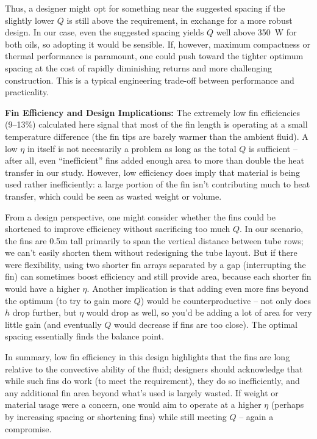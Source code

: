 \documentclass[12pt]{article}
\begin{document}
Thus, a designer might opt for something near the suggested spacing if the slightly lower $Q$ is still above the requirement, in exchange for a more robust design. In our case, even the suggested spacing yields $Q$ well above 350~W for both oils, so adopting it would be sensible. If, however, maximum compactness or thermal performance is paramount, one could push toward the tighter optimum spacing at the cost of rapidly diminishing returns and more challenging construction. This is a typical engineering trade-off between performance and practicality.

\textbf{Fin Efficiency and Design Implications:} The extremely low fin efficiencies (9–13\%) calculated here signal that most of the fin length is operating at a small temperature difference (the fin tips are barely warmer than the ambient fluid). A low $\eta$ in itself is not necessarily a problem as long as the total $Q$ is sufficient – after all, even “inefficient” fins added enough area to more than double the heat transfer in our study. However, low efficiency does imply that material is being used rather inefficiently: a large portion of the fin isn’t contributing much to heat transfer, which could be seen as wasted weight or volume.

From a design perspective, one might consider whether the fins could be shortened to improve efficiency without sacrificing too much $Q$. In our scenario, the fins are 0.5m tall primarily to span the vertical distance between tube rows; we can’t easily shorten them without redesigning the tube layout. But if there were flexibility, using two shorter fin arrays separated by a gap (interrupting the fin) can sometimes boost efficiency and still provide area, because each shorter fin would have a higher $\eta$. Another implication is that adding even more fins beyond the optimum (to try to gain more $Q$) would be counterproductive – not only does $h$ drop further, but $\eta$ would drop as well, so you’d be adding a lot of area for very little gain (and eventually $Q$ would decrease if fins are too close). The optimal spacing essentially finds the balance point.

In summary, low fin efficiency in this design highlights that the fins are long relative to the convective ability of the fluid; designers should acknowledge that while such fins do work (to meet the requirement), they do so inefficiently, and any additional fin area beyond what’s used is largely wasted. If weight or material usage were a concern, one would aim to operate at a higher $\eta$ (perhaps by increasing spacing or shortening fins) while still meeting $Q$ – again a compromise.
\end{document}

